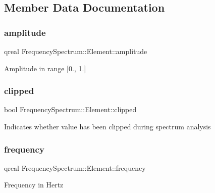 \subsection{Member Data Documentation}
\hypertarget{struct_frequency_spectrum_1_1_element_a057906284c20696169f327cae2f9ca80}{}\label{struct_frequency_spectrum_1_1_element_a057906284c20696169f327cae2f9ca80} 
\subsubsection{\texorpdfstring{amplitude}{amplitude}}
{\footnotesize\ttfamily qreal Frequency\+Spectrum\+::\+Element\+::amplitude}

Amplitude in range \mbox{[}0., 1.\mbox{]} \hypertarget{struct_frequency_spectrum_1_1_element_a686d40af2870a06fba032c480573792a}{}\label{struct_frequency_spectrum_1_1_element_a686d40af2870a06fba032c480573792a} 
\subsubsection{\texorpdfstring{clipped}{clipped}}
{\footnotesize\ttfamily bool Frequency\+Spectrum\+::\+Element\+::clipped}

Indicates whether value has been clipped during spectrum analysis \hypertarget{struct_frequency_spectrum_1_1_element_af6fb6c8a356fc27881bca9af0b89d88f}{}\label{struct_frequency_spectrum_1_1_element_af6fb6c8a356fc27881bca9af0b89d88f} 
\subsubsection{\texorpdfstring{frequency}{frequency}}
{\footnotesize\ttfamily qreal Frequency\+Spectrum\+::\+Element\+::frequency}

Frequency in Hertz \hypertarget{struct_frequency_spectrum_1_1_element_aea3fc976c7f3ba3d916d8017d847b011}{}\label{struct_frequency_spectrum_1_1_element_aea3fc976c7f3ba3d916d8017d847b011} 
